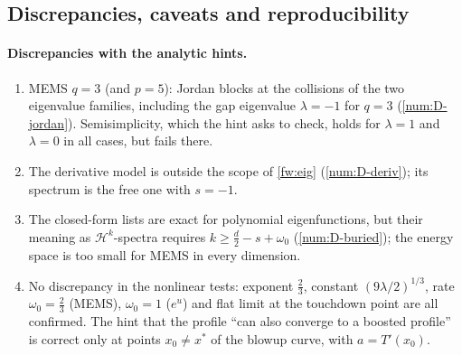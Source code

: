\subsection{Discrepancies, caveats and reproducibility}
\label{num:subsec-repro}

\paragraph{Discrepancies with the analytic hints.}
\begin{enumerate}[leftmargin=1.6em,itemsep=1pt]
\item MEMS $q=3$ (and $p=5$): Jordan blocks at the collisions of the two
  eigenvalue families, including the gap eigenvalue $\lambda=-1$ for $q=3$
  (\ref{num:D-jordan}). Semisimplicity, which the hint asks to check, holds for
  $\lambda=1$ and $\lambda=0$ in all cases, but fails there.
\item The derivative model is outside the scope of \eqref{fw:eig}
  (\ref{num:D-deriv}); its spectrum is the free one with $s=-1$.
\item The closed-form lists are exact for polynomial eigenfunctions, but their
  meaning as $\mathcal H^k$-spectra requires $k\ge\frac d2-s+\omega_0$
  (\ref{num:D-buried}); the energy space is too small for MEMS in every
  dimension.
\item No discrepancy in the nonlinear tests: exponent $\frac23$, constant
  $(9\lambda/2)^{1/3}$, rate $\omega_0=\frac23$ (MEMS), $\omega_0=1$ ($e^u$) and flat
  limit at the touchdown point are all confirmed. The hint that the profile
  ``can also converge to a boosted profile'' is correct only at points $x_0\neq x^*$
  of the blowup curve, with $a=T'(x_0)$.
\end{enumerate}

